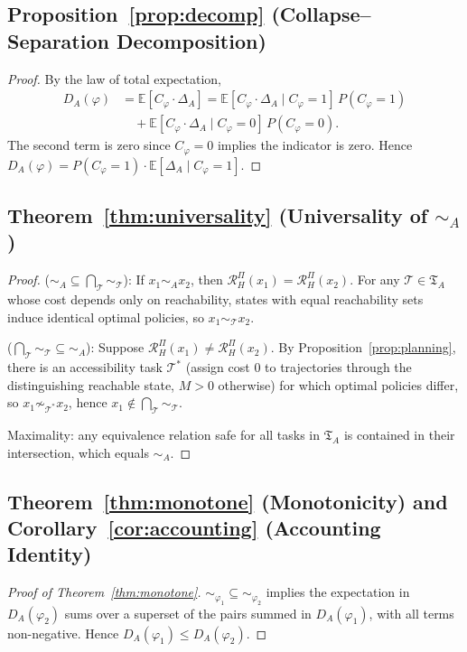 \documentclass[10pt,twocolumn]{article}
\theoremstyle{plain}
\theoremstyle{definition}
\theoremstyle{remark}
\newcommand{\simA}{\sim_{\!A}}
\newcommand{\RHP}{\mathcal{R}_{H}^{\Pi}}
\newcommand{\DA}{D_{A}(\varphi)}
\begin{document}
\subsection*{Proposition~\ref{prop:decomp} (Collapse--Separation Decomposition)}

\begin{proof}
By the law of total expectation,
\begin{align*}
  \DA &= \mathbb{E}[C_\varphi\cdot\Delta_A]
       = \mathbb{E}[C_\varphi\cdot\Delta_A\mid C_\varphi=1]\,P(C_\varphi=1)\\
      &\quad + \mathbb{E}[C_\varphi\cdot\Delta_A\mid C_\varphi=0]\,P(C_\varphi=0).
\end{align*}
The second term is zero since $C_\varphi=0$ implies the indicator is zero.
Hence $\DA = P(C_\varphi=1)\cdot\mathbb{E}[\Delta_A\mid C_\varphi=1]$.
\end{proof}

\subsection*{Theorem~\ref{thm:universality} (Universality of $\simA$)}

\begin{proof}
($\simA\subseteq\bigcap_\mathcal{T}\sim_\mathcal{T}$): If $x_1\simA x_2$,
then $\RHP(x_1)=\RHP(x_2)$. For any $\mathcal{T}\in\mathfrak{T}_A$ whose cost
depends only on reachability, states with equal reachability sets induce identical
optimal policies, so $x_1\sim_\mathcal{T} x_2$.

($\bigcap_\mathcal{T}\sim_\mathcal{T}\subseteq\simA$): Suppose
$\RHP(x_1)\neq\RHP(x_2)$. By Proposition~\ref{prop:planning}, there is an
accessibility task $\mathcal{T}^*$ (assign cost $0$ to trajectories through the
distinguishing reachable state, $M>0$ otherwise) for which optimal policies
differ, so $x_1\not\sim_{\mathcal{T}^*} x_2$, hence $x_1\notin
\bigcap_\mathcal{T}\sim_\mathcal{T}$.

Maximality: any equivalence relation safe for all tasks in $\mathfrak{T}_A$ is
contained in their intersection, which equals $\simA$.
\end{proof}

\subsection*{Theorem~\ref{thm:monotone} (Monotonicity) and
Corollary~\ref{cor:accounting} (Accounting Identity)}

\begin{proof}[Proof of Theorem~\ref{thm:monotone}]
${\sim_{\varphi_1}}\subseteq{\sim_{\varphi_2}}$ implies the expectation in
$D_A(\varphi_2)$ sums over a superset of the pairs summed in $D_A(\varphi_1)$,
with all terms non-negative. Hence $D_A(\varphi_1)\leq D_A(\varphi_2)$.
\end{proof}
\end{document}
